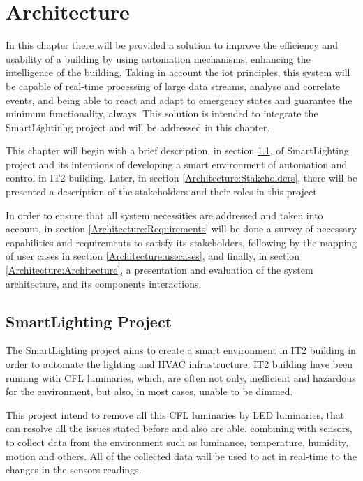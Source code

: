 \chapter{Architecture}
\label{chapter:architecture}

In this chapter there will be provided a solution to improve the efficiency and usability of a building by using automation mechanisms, enhancing the intelligence of the building. Taking in account the \ac{iot} principles, this system will be capable of real-time processing of large data streams, analyse and correlate events, and being able to react and adapt to emergency states and guarantee the minimum functionality, always. This solution is intended to integrate the SmartLightinhg project and will be addressed in this chapter.

This chapter will begin with a brief description, in section \ref{Architecture:slproject}, of SmartLighting project and its intentions of developing a smart environment of automation and control in IT2 building. Later, in section \ref{Architecture:Stakeholders}, there will be presented a description of the stakeholders and their roles in this project.

In order to ensure that all system necessities are addressed and taken into account, in section \ref{Architecture:Requirements} will be done a survey of necessary capabilities and  requirements to satisfy its stakeholders, following by the mapping of user cases in section \ref{Architecture:usecases}, and finally, in section \ref{Architecture:Architecture}, a presentation and evaluation of the system architecture, and its components interactions. 


\newpage


\section{SmartLighting Project}
\label{Architecture:slproject}

The SmartLighting project aims to create a smart environment in IT2 building in order to automate the lighting and HVAC infrastructure. IT2 building have been running with CFL luminaries, which, are often not only, inefficient and hazardous for the environment, but also, in most cases, unable to be dimmed. 

This project intend to remove all this CFL luminaries by LED luminaries, that can resolve all the issues stated before and also are able, combining with sensors, to collect data from the environment such as luminance, temperature, humidity, motion and others. All of the collected data will be used to act in real-time to the changes in the sensors readings. 

